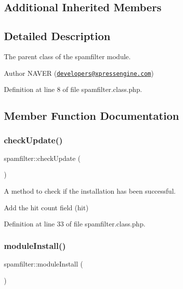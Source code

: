 \subsection*{Additional Inherited Members}


\subsection{Detailed Description}
The parent class of the spamfilter module. 

\begin{DoxyAuthor}{Author}
N\+A\+V\+ER (\href{mailto:developers@xpressengine.com}{\tt developers@xpressengine.\+com}) 
\end{DoxyAuthor}


Definition at line 8 of file spamfilter.\+class.\+php.



\subsection{Member Function Documentation}
\hypertarget{classspamfilter_a4188af3ccfed17cb4da4a34f7931101e}{}\label{classspamfilter_a4188af3ccfed17cb4da4a34f7931101e} 
\subsubsection{\texorpdfstring{check\+Update()}{checkUpdate()}}
{\footnotesize\ttfamily spamfilter\+::check\+Update (\begin{DoxyParamCaption}{ }\end{DoxyParamCaption})}



A method to check if the installation has been successful. 

Add the hit count field (hit)

Definition at line 33 of file spamfilter.\+class.\+php.

\hypertarget{classspamfilter_a954acbd202a4fd956703c0b212589392}{}\label{classspamfilter_a954acbd202a4fd956703c0b212589392} 
\subsubsection{\texorpdfstring{module\+Install()}{moduleInstall()}}
{\footnotesize\ttfamily spamfilter\+::module\+Install (\begin{DoxyParamCaption}{ }\end{DoxyParamCaption})}



